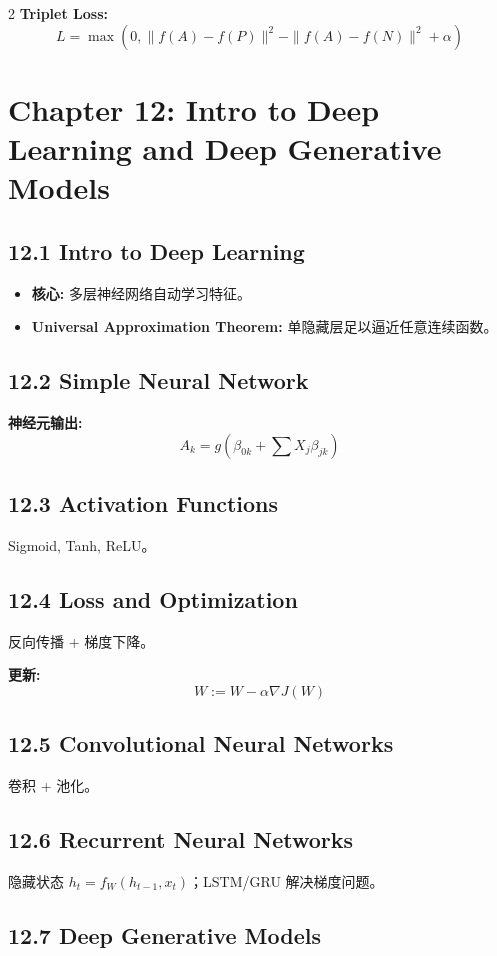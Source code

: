 \documentclass[6pt,a4paper]{ctexart}
\begin{document}
\begin{multicols}{2}
\textbf{Triplet Loss:}
$$ L = \max(0, \|f(A)-f(P)\|^2 - \|f(A)-f(N)\|^2 + \alpha) $$

\section*{Chapter 12: Intro to Deep Learning and Deep Generative Models}

\subsection*{12.1 Intro to Deep Learning}
\begin{itemize}
    \item \textbf{核心:} 多层神经网络自动学习特征。
    \item \textbf{Universal Approximation Theorem:} 单隐藏层足以逼近任意连续函数。
\end{itemize}

\subsection*{12.2 Simple Neural Network}
\textbf{神经元输出:}
$$ A_{k} = g \left( \beta_{0k} + \sum X_{j} \beta_{jk} \right) $$

\subsection*{12.3 Activation Functions}
Sigmoid, Tanh, ReLU。

\subsection*{12.4 Loss and Optimization}
反向传播 + 梯度下降。

\textbf{更新:}
$$ W := W - \alpha \nabla J(W) $$

\subsection*{12.5 Convolutional Neural Networks}
卷积 + 池化。

\subsection*{12.6 Recurrent Neural Networks}
隐藏状态 $h_t = f_W(h_{t-1}, x_t)$；LSTM/GRU 解决梯度问题。

\subsection*{12.7 Deep Generative Models}


\end{multicols}
\end{document}
